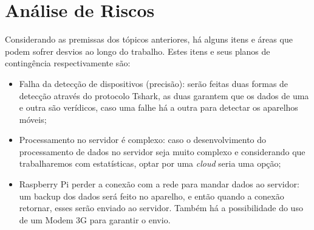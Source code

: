 \section{Análise de Riscos}
Considerando as premissas dos tópicos anteriores, há alguns itens e áreas que podem sofrer desvios ao longo do trabalho. Estes itens e seus planos
de contingência respectivamente são:

\begin{itemize}
  \item Falha da detecção de dispositivos (precisão): serão feitas duas formas de detecção através do protocolo Tshark, as duas garantem que os dados
  de uma e outra são verídicos, caso uma falhe há a outra para detectar os aparelhos móveis;
  \item Processamento no servidor é complexo: caso o desenvolvimento do processamento de dados no servidor seja muito complexo e considerando
  que trabalharemos com estatísticas, optar por uma \emph{cloud} seria uma opção;
  \item Raspberry Pi perder a conexão com a rede para mandar dados ao servidor: um backup dos dados será feito no aparelho, e então quando
  a conexão retornar, esses serão enviado ao servidor. Também há a possibilidade do uso de um Modem 3G para garantir o envio.
\end{itemize}
